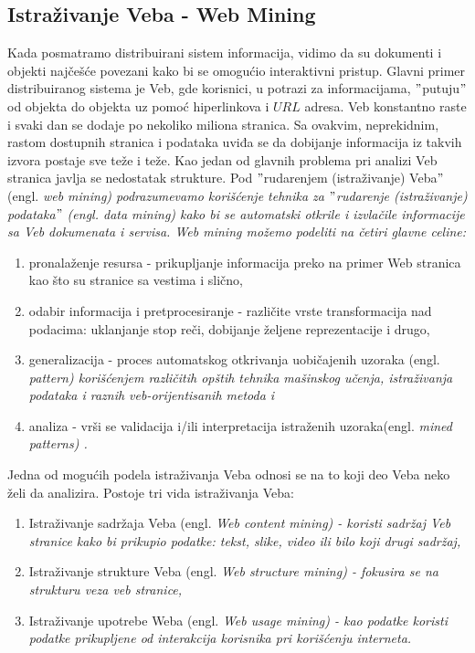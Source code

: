 \documentclass[a4paper]{article}
\begin{document}
\subsection{Istraživanje Veba - Web Mining}
\label{sec:veb}
Kada posmatramo distribuirani sistem informacija, vidimo da su dokumenti i objekti najčešće povezani kako bi se omogućio interaktivni pristup. Glavni primer distribuiranog sistema je Veb, gde korisnici, u potrazi za informacijama, $"$putuju$"$ od objekta do objekta uz pomoć hiperlinkova i $URL$ adresa. Veb konstantno raste i svaki dan se dodaje po nekoliko miliona stranica. Sa ovakvim, neprekidnim, rastom dostupnih stranica i podataka uviđa se da dobijanje informacija iz takvih izvora postaje sve teže i teže. Kao jedan od glavnih problema pri analizi Veb stranica javlja se nedostatak strukture. Pod $"$rudarenjem  (istraživanje) Veba$"$ (engl. \em{web mining}) podrazumevamo korišćenje tehnika za $"$rudarenje (istraživanje) podataka$"$ (engl. \em{data mining}) kako bi se automatski otkrile i izvlačile informacije sa Veb dokumenata i servisa. Web mining možemo podeliti na četiri glavne celine:
\begin{enumerate}
\item pronalaženje resursa - prikupljanje informacija preko na primer Web stranica kao što su stranice sa vestima i slično,
\item odabir informacija i pretprocesiranje - različite vrste transformacija nad podacima: uklanjanje stop reči, dobijanje željene reprezentacije i drugo,
\item generalizacija - proces automatskog otkrivanja uobičajenih uzoraka (engl. \em{pattern}) korišćenjem različitih opštih tehnika mašinskog učenja, istraživanja podataka i raznih veb-orijentisanih metoda i  
\item analiza - vrši se validacija i/ili interpretacija istraženih uzoraka(engl. \em{mined patterns}) . 
\end{enumerate}
Jedna od mogućih podela istraživanja Veba odnosi se na to koji deo Veba neko želi da analizira. Postoje tri vida istraživanja Veba:
\begin{enumerate}
\item Istraživanje sadržaja Veba (engl. \em{Web content mining}) - koristi sadržaj Veb stranice kako bi prikupio podatke: tekst, slike, video ili bilo koji drugi sadržaj,
\item Istraživanje strukture Veba (engl. \em{Web structure mining}) - fokusira se na strukturu veza veb stranice,
\item Istraživanje upotrebe Weba (engl. \em{Web usage mining}) - kao podatke koristi podatke prikupljene od interakcija korisnika pri korišćenju interneta.
\end{enumerate}
\end{document}
